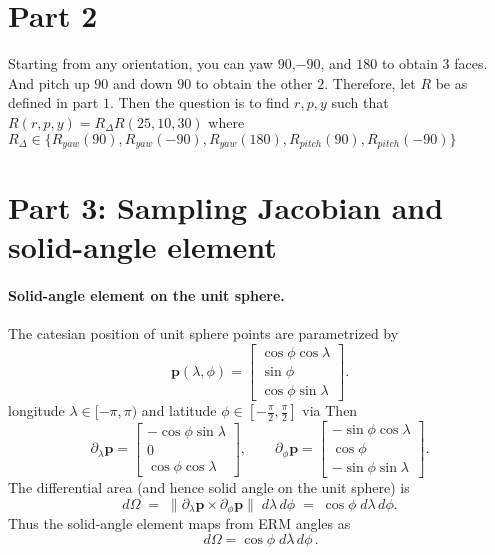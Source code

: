 \documentclass{article}
\begin{document}
\section{Part 2}
Starting from any orientation, you can yaw $90$,$ -90$, and $180$ to obtain $3$ faces. And pitch up $90$ and down $90$ to obtain the other $2$. 
Therefore, let $R$ be as defined in part $1$. Then the question is to find $r, p, y$ such that 
$R(r, p, y) = R_\Delta R(25, 10, 30)$
where $R_\Delta \in \{R_{yaw}(90), R_{yaw}(-90), R_{yaw}(180), R_{pitch}(90), R_{pitch}(-90)\}$
\section{Part 3: Sampling Jacobian and solid-angle element} 
\paragraph{Solid-angle element on the unit sphere.}
The catesian position of unit sphere points are parametrized by 
\[
\bm{p}(\lambda,\phi)=
\begin{bmatrix}
\cos\phi\cos\lambda\\[2pt]
\sin\phi\\[2pt]
\cos\phi\sin\lambda
\end{bmatrix}.
\] longitude $\lambda \in [-\pi,\pi)$ and latitude
$\phi \in [-\tfrac{\pi}{2},\tfrac{\pi}{2}]$ via
Then
\[
\partial_\lambda \bm{p}=
\begin{bmatrix}
-\cos\phi\sin\lambda\\[2pt]
0\\[2pt]
\cos\phi\cos\lambda
\end{bmatrix},\qquad
\partial_\phi \bm{p}=
\begin{bmatrix}
-\sin\phi\cos\lambda\\[2pt]
\cos\phi\\[2pt]
-\sin\phi\sin\lambda
\end{bmatrix}.
\]
The differential area (and hence solid angle on the unit sphere) is
\[
d\Omega \;=\; \|\partial_\lambda \bm{p}\times \partial_\phi \bm{p}\|\; d\lambda\, d\phi
\;=\; \cos\phi \; d\lambda\, d\phi.
\]
Thus the solid-angle element maps from ERM angles as
\[
\boxed{\,d\Omega=\cos\phi\; d\lambda\, d\phi\, }.
\]
\end{document}
